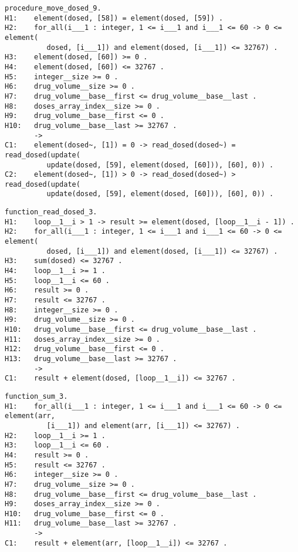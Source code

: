 \begin{lstlisting}[frame=single, gobble=0, caption={Undischarged Verification Condition from move\_dosed.siv file}, label={listing:pcapump_undischarged_vc_move_dosed}]
procedure_move_dosed_9.
H1:    element(dosed, [58]) = element(dosed, [59]) .
H2:    for_all(i___1 : integer, 1 <= i___1 and i___1 <= 60 -> 0 <= element(
          dosed, [i___1]) and element(dosed, [i___1]) <= 32767) .
H3:    element(dosed, [60]) >= 0 .
H4:    element(dosed, [60]) <= 32767 .
H5:    integer__size >= 0 .
H6:    drug_volume__size >= 0 .
H7:    drug_volume__base__first <= drug_volume__base__last .
H8:    doses_array_index__size >= 0 .
H9:    drug_volume__base__first <= 0 .
H10:   drug_volume__base__last >= 32767 .
       ->
C1:    element(dosed~, [1]) = 0 -> read_dosed(dosed~) = read_dosed(update(
          update(dosed, [59], element(dosed, [60])), [60], 0)) .
C2:    element(dosed~, [1]) > 0 -> read_dosed(dosed~) > read_dosed(update(
          update(dosed, [59], element(dosed, [60])), [60], 0)) .
\end{lstlisting}

\begin{lstlisting}[frame=single, gobble=0, caption={Undischarged Verification Condition from read\_dosed.siv file}, label={listing:pcapump_undischarged_vc_read_dosed}]
function_read_dosed_3.
H1:    loop__1__i > 1 -> result >= element(dosed, [loop__1__i - 1]) .
H2:    for_all(i___1 : integer, 1 <= i___1 and i___1 <= 60 -> 0 <= element(
          dosed, [i___1]) and element(dosed, [i___1]) <= 32767) .
H3:    sum(dosed) <= 32767 .
H4:    loop__1__i >= 1 .
H5:    loop__1__i <= 60 .
H6:    result >= 0 .
H7:    result <= 32767 .
H8:    integer__size >= 0 .
H9:    drug_volume__size >= 0 .
H10:   drug_volume__base__first <= drug_volume__base__last .
H11:   doses_array_index__size >= 0 .
H12:   drug_volume__base__first <= 0 .
H13:   drug_volume__base__last >= 32767 .
       ->
C1:    result + element(dosed, [loop__1__i]) <= 32767 .
\end{lstlisting}

\begin{lstlisting}[frame=single, gobble=0, caption={Undischarged Verification Condition from sum.siv file}, label={listing:pcapump_undischarged_vc_sum}]
function_sum_3.
H1:    for_all(i___1 : integer, 1 <= i___1 and i___1 <= 60 -> 0 <= element(arr, 
          [i___1]) and element(arr, [i___1]) <= 32767) .
H2:    loop__1__i >= 1 .
H3:    loop__1__i <= 60 .
H4:    result >= 0 .
H5:    result <= 32767 .
H6:    integer__size >= 0 .
H7:    drug_volume__size >= 0 .
H8:    drug_volume__base__first <= drug_volume__base__last .
H9:    doses_array_index__size >= 0 .
H10:   drug_volume__base__first <= 0 .
H11:   drug_volume__base__last >= 32767 .
       ->
C1:    result + element(arr, [loop__1__i]) <= 32767 .
\end{lstlisting}

